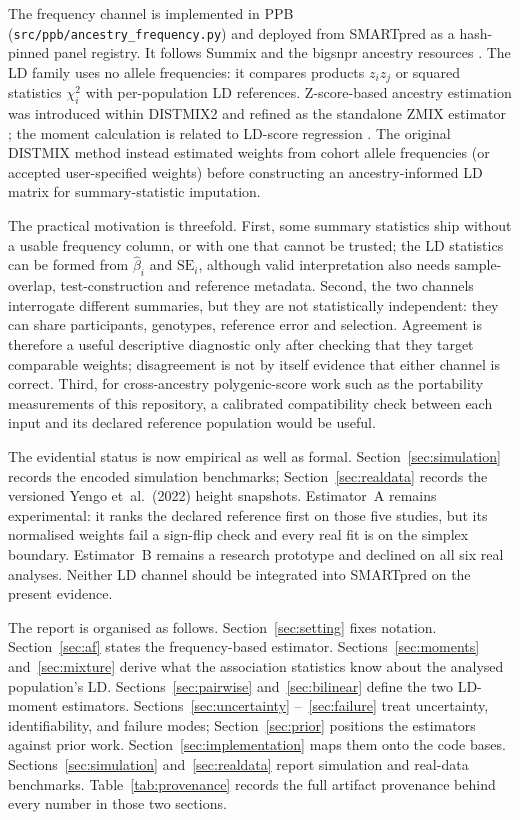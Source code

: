 \documentclass[11pt,a4paper]{article}
\begin{document}
The frequency channel is implemented in PPB
(\texttt{src/ppb/ancestry\_frequency.py}) and deployed from SMARTpred
as a hash-pinned panel registry. It follows Summix
\citep{arriaga2021summix,stoneman2025summix2} and the bigsnpr ancestry
resources \citep{prive2018bigsnpr,privefl_vignette}. The LD family uses no
allele frequencies: it compares products $z_i z_j$ or squared statistics
$\chi^2_i$ with per-population LD references. Z-score-based ancestry
estimation was introduced within DISTMIX2 \citep{chatzinakos2021distmix2}
and refined as the standalone ZMIX estimator \citep{dennis2024zmix}; the
moment calculation is related to LD-score regression
\citep{bulik2015ldsc}. The original DISTMIX method
\citep{lee2015distmix} instead estimated weights from cohort allele
frequencies (or accepted user-specified weights) before constructing an
ancestry-informed LD matrix for summary-statistic imputation.

The practical motivation is threefold. First, some summary statistics ship
without a usable frequency column, or with one that cannot be trusted; the
LD statistics can be formed from $\hat\beta_i$ and $\mathrm{SE}_i$, although
valid interpretation also needs sample-overlap, test-construction and
reference metadata. Second, the two
channels interrogate different summaries, but they are not statistically
independent: they can share participants, genotypes, reference error and
selection. Agreement is therefore a useful descriptive diagnostic only
after checking that they target comparable weights; disagreement is not by
itself evidence that either channel is correct. Third, for
cross-ancestry polygenic-score work such as the portability measurements of
this repository, a calibrated compatibility check between each input and its
declared reference population would be useful.

The evidential status is now empirical as well as formal.
Section~\ref{sec:simulation} records the encoded simulation benchmarks;
Section~\ref{sec:realdata} records the versioned Yengo et~al.\ (2022)
height snapshots. Estimator~A remains experimental: it ranks the
declared reference first on those five studies, but its normalised
weights fail a sign-flip check and every real fit is on the simplex
boundary. Estimator~B remains a research prototype and declined on all
six real analyses. Neither LD channel should be integrated into
SMARTpred on the present evidence.

The report is organised as follows. Section~\ref{sec:setting} fixes
notation. Section~\ref{sec:af} states the frequency-based estimator.
Sections~\ref{sec:moments} and~\ref{sec:mixture} derive what the
association statistics know about the analysed population's LD.
Sections~\ref{sec:pairwise} and~\ref{sec:bilinear} define the two
LD-moment estimators. Sections~\ref{sec:uncertainty}
--~\ref{sec:failure} treat uncertainty, identifiability, and failure
modes; Section~\ref{sec:prior} positions the estimators against prior
work. Section~\ref{sec:implementation} maps them onto the code bases.
Sections~\ref{sec:simulation} and~\ref{sec:realdata} report simulation
and real-data benchmarks. Table~\ref{tab:provenance} records the full
artifact provenance behind every number in those two sections.
\end{document}
